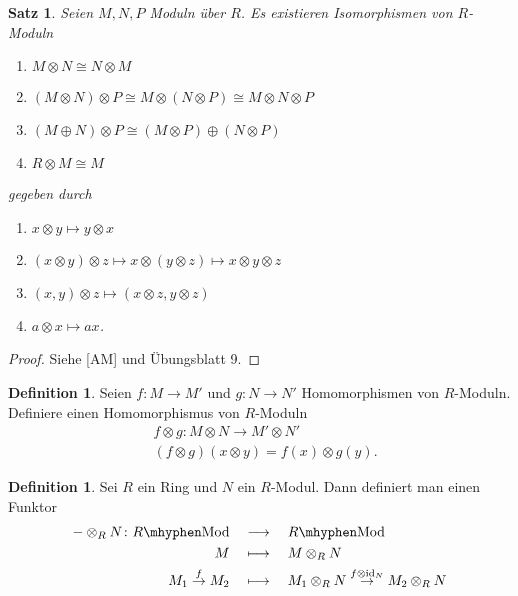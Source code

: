 \documentclass[reqno,12pt]{article}
\numberwithin{equation}{section}
\newcommand{\id}{\text{id}}
\theoremstyle{plain}
\newtheorem{proposition}[thm]{Satz}
\theoremstyle{definition}
\newtheorem{definition}[thm]{Definition}
\newcommand{\blank}{{-}}
\newcommand{\Mod}{\text{Mod}}
\begin{document}
\begin{proposition}\label{satz-properties-of-tensor-product}
Seien $M,N,P$ Moduln über $R$. Es existieren Isomorphismen von $R$-Moduln
\begin{enumerate}
  \item $M \otimes N \cong N \otimes M$
  \item $(M \otimes N) \otimes P \cong M \otimes (N \otimes P) \cong M \otimes N \otimes P$
  \item $(M \oplus N) \otimes P \cong (M \otimes P) \oplus  (N \otimes P)$
  \item $R \otimes M \cong M$
\end{enumerate}
gegeben durch
\begin{enumerate}
  \item $x \otimes y \mapsto y \otimes x$
  \item $(x \otimes y) \otimes z  \mapsto  x \otimes (y \otimes z)  \mapsto   x \otimes y \otimes z$
  \item $(x, y) \otimes z  \mapsto (x \otimes z , y \otimes z)$
  \item $a \otimes x \mapsto ax$.
\end{enumerate}
\end{proposition}

\begin{proof}
Siehe [AM] und Übungsblatt 9.
\end{proof}

\begin{definition}
Seien $f \colon M \to M'$ und $g \colon N \to N'$ Homomorphismen von $R$-Moduln. Definiere einen Homomorphismus von $R$-Moduln
\begin{align*}
& f \otimes g \colon M \otimes N \to M' \otimes N' \\
& (f \otimes g) (x \otimes y) = f(x) \otimes g(y).
\end{align*}

\end{definition}


\begin{definition}
Sei $R$ ein Ring und $N$ ein $R$-Modul. Dann definiert man einen Funktor
\begin{align*}
\blank \otimes_R N \colon R \mhyphen \Mod \quad &\longrightarrow  \quad R \mhyphen \Mod \\
\qquad \qquad M  \quad  &\longmapsto  \quad   M \otimes_R N \\
\qquad M_1 \overset{f}{\to} M_2  \quad&\longmapsto \quad  M_1 \otimes_R N \overset{f \otimes \id_N}{\to} M_2 \otimes_R N
\end{align*}
\end{definition}
\end{document}
